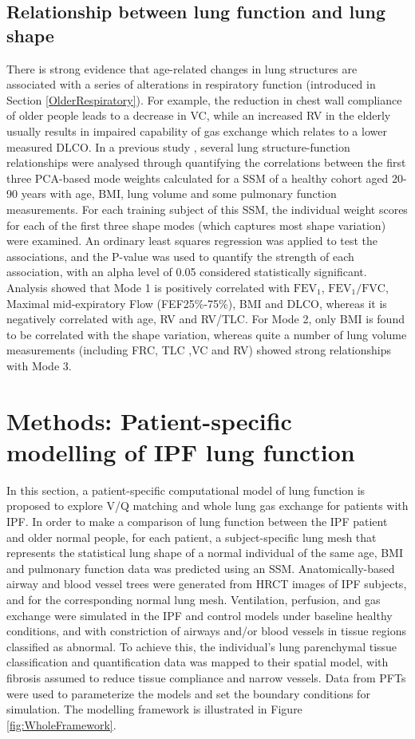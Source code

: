 \subsection{Relationship between lung function and lung shape}
There is strong evidence that age-related changes in lung structures are associated with a series of alterations in respiratory function (introduced in Section \ref{OlderRespiratory}). For example, the reduction in chest wall compliance of older people leads to a decrease in VC, while an increased RV in the elderly usually results in impaired capability of gas exchange which relates to a lower measured DLCO. In a previous study \citep{Osanlouy2018Statistical}, several lung structure-function relationships were analysed through quantifying the correlations between the first three PCA-based mode weights calculated for a SSM of a healthy cohort aged 20-90 years with age, BMI, lung volume and some pulmonary function measurements. For each training subject of this SSM, the individual weight scores for each of the first three shape modes (which captures most shape variation) were examined. An ordinary least squares regression was applied to test the associations, and the P-value was used to quantify the strength of each association, with an alpha level of 0.05 considered statistically significant. Analysis showed that Mode 1 is positively correlated with $\mathrm{FEV_1}$, $\mathrm{FEV_1/FVC}$, Maximal mid-expiratory Flow (FEF25\%-75\%), BMI and DLCO, whereas it is negatively correlated with age, RV and RV/TLC. For Mode 2, only BMI is found to be correlated with the shape variation, whereas quite a number of lung volume measurements (including FRC, TLC ,VC and RV) showed strong relationships with Mode 3.

\section{Methods: Patient-specific modelling of IPF lung function}
In this section, a patient-specific computational model of lung function is proposed to explore V/Q matching and whole lung gas exchange for patients with IPF. In order to make a comparison of lung function between the IPF patient and older normal people, for each patient, a subject-specific lung mesh that represents the statistical lung shape of a normal individual of the same age, BMI and pulmonary function data was predicted using an SSM. Anatomically-based airway and blood vessel trees were generated from HRCT images of IPF subjects, and for the corresponding normal lung mesh. Ventilation, perfusion, and gas exchange were simulated in the IPF and control models under baseline healthy conditions, and with constriction of airways and/or blood vessels in tissue regions classified as abnormal. To achieve this, the individual's lung parenchymal tissue classification and quantification data was mapped to their spatial model, with fibrosis assumed to reduce tissue compliance and narrow vessels. Data from PFTs were used to parameterize the models and set the boundary conditions for simulation. The modelling framework is illustrated in Figure \ref{fig:WholeFramework}. 

